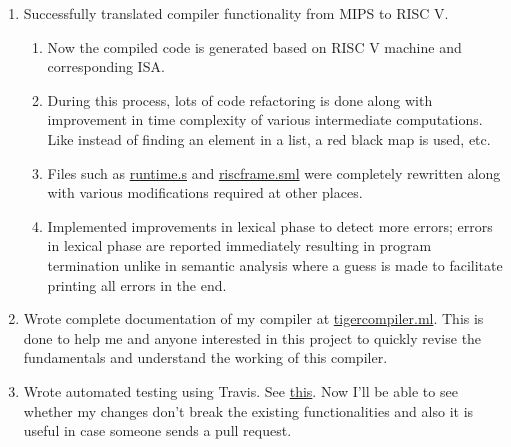 \begin{enumerate}
  \item Successfully translated compiler functionality from MIPS to RISC V.
    \begin{enumerate} 
      \item Now the compiled code is generated based on RISC V machine and corresponding ISA.
      \item During this process, lots of code refactoring is done along with improvement in time complexity of various intermediate computations. Like instead of finding an element in a list, a red black map is used, etc.  
      \item Files such as \href{https://github.com/sourabh2311/btp/blob/master/Compiler/runtime.s}{runtime.s} and \href{https://github.com/sourabh2311/btp/blob/master/Compiler/riscframe.sml}{riscframe.sml} were completely rewritten along with various modifications required at other places.
      \item Implemented improvements in lexical phase to detect more errors; errors in lexical phase are reported immediately resulting in program termination unlike in semantic analysis where a guess is made to facilitate printing all errors in the end.
    \end{enumerate}
  \item Wrote complete documentation of my compiler at \href{https://tigercompiler.ml}{tigercompiler.ml}. This is done to help me and anyone interested in this project to quickly revise the fundamentals and understand the working of this compiler.

  \item Wrote automated testing using Travis. See \href{https://travis-ci.org/sourabh2311/btp}{this}. Now I'll be able to see whether my changes don't break the existing functionalities and also it is useful in case someone sends a pull request.


\end{enumerate}
